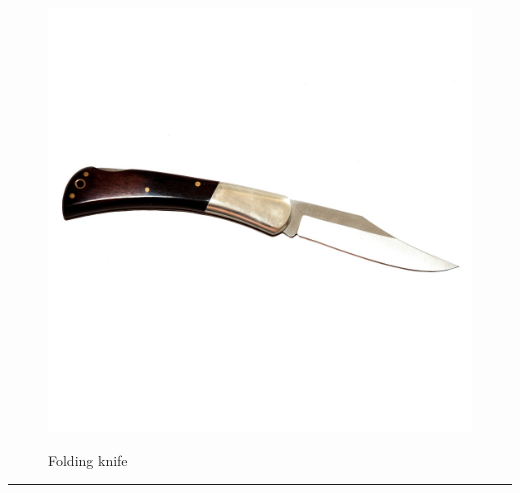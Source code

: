 \documentclass{article}
\begin{document}
    \begin{figure}[H]
        \centering
        \begin{minipage}{0.25\textwidth}
            \centering
            \includegraphics[width=\textwidth]{../SurvivalItemImages/knife}
        \end{minipage}\hfill
        \begin{minipage}{0.7\textwidth}
            \centering
            \Large Folding knife
        \end{minipage}
    \end{figure}
    \vspace{-0.8em}
    \noindent\rule{\textwidth}{0.4pt}
            
\end{document}
